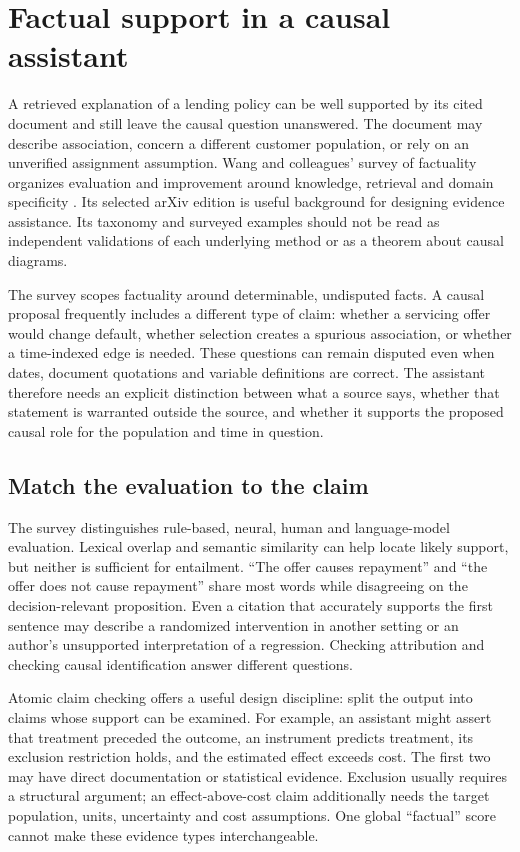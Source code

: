 \section{Factual support in a causal assistant}
\label{exec22:fact-scope}

A retrieved explanation of a lending policy can be well supported by its cited
document and still leave the causal question unanswered. The document may
describe association, concern a different customer population, or rely on an
unverified assignment assumption. Wang and colleagues' survey of factuality
organizes evaluation and improvement around knowledge, retrieval and domain
specificity \cite{exec22_factuality_wang}. Its selected arXiv edition is useful
background for designing evidence assistance. Its taxonomy and surveyed
examples should not be read as independent validations of each underlying
method or as a theorem about causal diagrams.

The survey scopes factuality around determinable, undisputed facts. A causal
proposal frequently includes a different type of claim: whether a servicing
offer would change default, whether selection creates a spurious association,
or whether a time-indexed edge is needed. These questions can remain disputed
even when dates, document quotations and variable definitions are correct.
The assistant therefore needs an explicit distinction between what a source
says, whether that statement is warranted outside the source, and whether it
supports the proposed causal role for the population and time in question.

\subsection{Match the evaluation to the claim}

The survey distinguishes rule-based, neural, human and language-model
evaluation. Lexical overlap and semantic similarity can help locate likely
support, but neither is sufficient for entailment. ``The offer causes
repayment'' and ``the offer does not cause repayment'' share most words while
disagreeing on the decision-relevant proposition. Even a citation that
accurately supports the first sentence may describe a randomized intervention
in another setting or an author's unsupported interpretation of a regression.
Checking attribution and checking causal identification answer different
questions.

Atomic claim checking offers a useful design discipline: split the output into
claims whose support can be examined. For example, an assistant might assert
that treatment preceded the outcome, an instrument predicts treatment, its
exclusion restriction holds, and the estimated effect exceeds cost. The first
two may have direct documentation or statistical evidence. Exclusion usually
requires a structural argument; an effect-above-cost claim additionally needs
the target population, units, uncertainty and cost assumptions. One global
``factual'' score cannot make these evidence types interchangeable.


